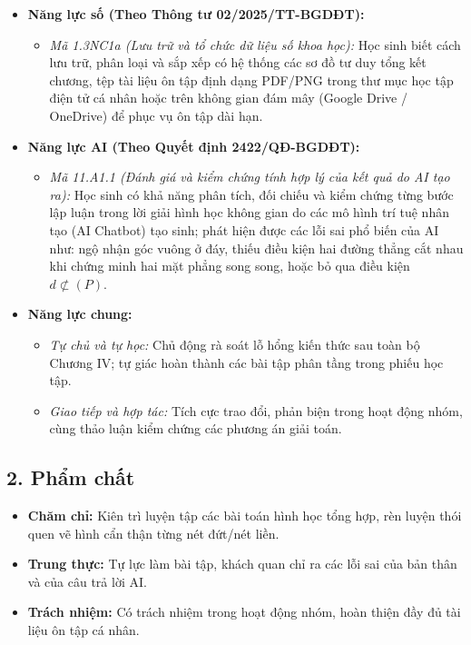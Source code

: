\documentclass[12pt, a4paper]{article}
\begin{document}
\begin{itemize}[leftmargin=1.2cm]
    \item \textbf{Năng lực số (Theo Thông tư 02/2025/TT-BGDĐT):}
    \begin{itemize}[leftmargin=0.6cm]
        \item \textit{Mã 1.3NC1a (Lưu trữ và tổ chức dữ liệu số khoa học):} Học sinh biết cách lưu trữ, phân loại và sắp xếp có hệ thống các sơ đồ tư duy tổng kết chương, tệp tài liệu ôn tập định dạng PDF/PNG trong thư mục học tập điện tử cá nhân hoặc trên không gian đám mây (Google Drive / OneDrive) để phục vụ ôn tập dài hạn.
    \end{itemize}

    \item \textbf{Năng lực AI (Theo Quyết định 2422/QĐ-BGDĐT):}
    \begin{itemize}[leftmargin=0.6cm]
        \item \textit{Mã 11.A1.1 (Đánh giá và kiểm chứng tính hợp lý của kết quả do AI tạo ra):} Học sinh có khả năng phân tích, đối chiếu và kiểm chứng từng bước lập luận trong lời giải hình học không gian do các mô hình trí tuệ nhân tạo (AI Chatbot) tạo sinh; phát hiện được các lỗi sai phổ biến của AI như: ngộ nhận góc vuông ở đáy, thiếu điều kiện hai đường thẳng cắt nhau khi chứng minh hai mặt phẳng song song, hoặc bỏ qua điều kiện $d \not\subset (P)$.
    \end{itemize}

    \item \textbf{Năng lực chung:}
    \begin{itemize}[leftmargin=0.6cm]
        \item \textit{Tự chủ và tự học:} Chủ động rà soát lỗ hổng kiến thức sau toàn bộ Chương IV; tự giác hoàn thành các bài tập phân tầng trong phiếu học tập.
        \item \textit{Giao tiếp và hợp tác:} Tích cực trao đổi, phản biện trong hoạt động nhóm, cùng thảo luận kiểm chứng các phương án giải toán.
    \end{itemize}
\end{itemize}

\subsection*{2. Phẩm chất}

\begin{itemize}[leftmargin=1.2cm]
    \item \textbf{Chăm chỉ:} Kiên trì luyện tập các bài toán hình học tổng hợp, rèn luyện thói quen vẽ hình cẩn thận từng nét đứt/nét liền.
    \item \textbf{Trung thực:} Tự lực làm bài tập, khách quan chỉ ra các lỗi sai của bản thân và của câu trả lời AI.
    \item \textbf{Trách nhiệm:} Có trách nhiệm trong hoạt động nhóm, hoàn thiện đầy đủ tài liệu ôn tập cá nhân.
\end{itemize}
\end{document}

